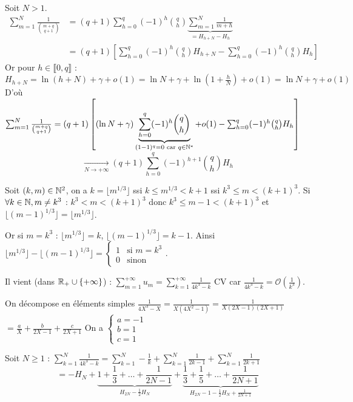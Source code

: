 \begin{solution}
Soit $N > 1$.
\begin{align*}
\sum_{m=1}^N \frac{1}{\binom{m+q}{q+1}} &= (q+1) \sum_{h=0}^q (-1)^h \binom{q}{h} \underbrace{\sum_{m=1}^N \frac{1}{m+h}}_{= H_{h+N} - H_h} \\
&= (q+1) \left[ \sum_{h=0}^q (-1)^h \binom{q}{h} H_{h+N} - \sum_{h=0}^q (-1)^h \binom{q}{h} H_h \right]
\end{align*}
Or pour $h \in \llbracket 0, q \rrbracket$ :
$H_{h+N} = \ln(h+N) + \gamma + o(1) = \ln N + \gamma + \ln\left(1 + \frac{h}{N}\right) + o(1) = \ln N + \gamma + o(1)$
D'où $\sum_{m=1}^N \frac{1}{\binom{m+q}{q+1}} = (q+1) \left[ (\ln N + \gamma) \underbrace{\sum_{h=0}^q (-1)^h \binom{q}{h}}_{(1-1)^q = 0 \text{ car } q \in \mathbb N^*} + o(1) - \sum_{h=0}^q (-1)^h \binom{q}{h} H_h \right]$
\[
\xrightarrow[N \to +\infty]{} (q+1) \sum_{h=0}^q (-1)^{h+1} \binom{q}{h} H_h
\]

Soit $(k,m) \in \mathbb N^2$, on a $k = \lfloor m^{1/3} \rfloor$ ssi $k \leq m^{1/3} < k+1$ ssi $k^3 \leq m < (k+1)^3$.
Si $\forall k \in \mathbb N, m \neq k^3$ : $k^3 < m < (k+1)^3$
donc $k^3 \leq m-1 < (k+1)^3$
et $\lfloor (m-1)^{1/3} \rfloor = \lfloor m^{1/3} \rfloor$.

Or si $m = k^3$ : $\lfloor m^{1/3} \rfloor = k$, $\lfloor (m-1)^{1/3} \rfloor = k-1$.
Ainsi $\lfloor m^{1/3} \rfloor - \lfloor (m-1)^{1/3} \rfloor = \begin{cases} 1 & \text{si } m = k^3 \\ 0 & \text{sinon} \end{cases}$.

Il vient (dans $\mathbb R_+ \cup \{+\infty\}$) : $\sum_{m=1}^{+\infty} u_m = \sum_{k=1}^{+\infty} \frac{1}{4k^3 - k}$ CV 
car $\frac{1}{4k^3 - k} = \mathcal{O}\left(\frac{1}{k^3}\right)$.

On décompose en éléments simples $\frac{1}{4X^3 - X} = \frac{1}{X(4X^2 - 1)} = \frac{1}{X(2X-1)(2X+1)}$
$= \frac{a}{X} + \frac{b}{2X-1} + \frac{c}{2X+1}$
On a $\begin{cases} a = -1 \\ b = 1 \\ c = 1 \end{cases}$

Soit $N \geq 1$ : $\sum_{k=1}^N \frac{1}{4k^3 - k} = \sum_{k=1}^N -\frac{1}{k} + \sum_{k=1}^N \frac{1}{2k-1} + \sum_{k=1}^N \frac{1}{2k+1}$
\[
= -H_N + \underbrace{1 + \frac{1}{3} + \dots + \frac{1}{2N-1}}_{H_{2N} - \frac{1}{2}H_N} + \underbrace{\frac{1}{3} + \frac{1}{5} + \dots + \frac{1}{2N+1}}_{H_{2N} - 1 - \frac{1}{2}H_N + \frac{1}{2N+1}}
\]
\end{solution}
